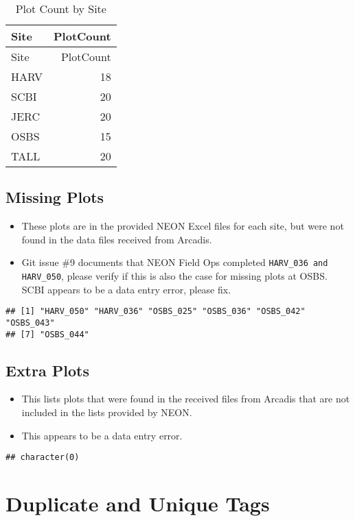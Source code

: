 \documentclass[]{article}
\begin{document}
\begin{longtable}[c]{@{}lr@{}}
\caption{Plot Count by Site}\tabularnewline
\toprule
Site & PlotCount\tabularnewline
\midrule
\endfirsthead
\toprule
Site & PlotCount\tabularnewline
\midrule
\endhead
HARV & 18\tabularnewline
SCBI & 20\tabularnewline
JERC & 20\tabularnewline
OSBS & 15\tabularnewline
TALL & 20\tabularnewline
\bottomrule
\end{longtable}

\subsection{Missing Plots}\label{missing-plots}

\begin{itemize}
\itemsep1pt\parskip0pt
\item
  These plots are in the provided NEON Excel files for each site, but
  were not found in the data files received from Arcadis.
\item
  Git issue \#9 documents that NEON Field Ops completed
  \texttt{HARV\_036 and HARV\_050}, please verify if this is also the
  case for missing plots at OSBS. SCBI appears to be a data entry error,
  please fix.
\end{itemize}

\begin{verbatim}
## [1] "HARV_050" "HARV_036" "OSBS_025" "OSBS_036" "OSBS_042" "OSBS_043"
## [7] "OSBS_044"
\end{verbatim}

\subsection{Extra Plots}\label{extra-plots}

\begin{itemize}
\itemsep1pt\parskip0pt
\item
  This lists plots that were found in the received files from Arcadis
  that are not included in the lists provided by NEON.
\item
  This appears to be a data entry error.
\end{itemize}

\begin{verbatim}
## character(0)
\end{verbatim}

\section{Duplicate and Unique Tags}\label{duplicate-and-unique-tags}
\end{document}
